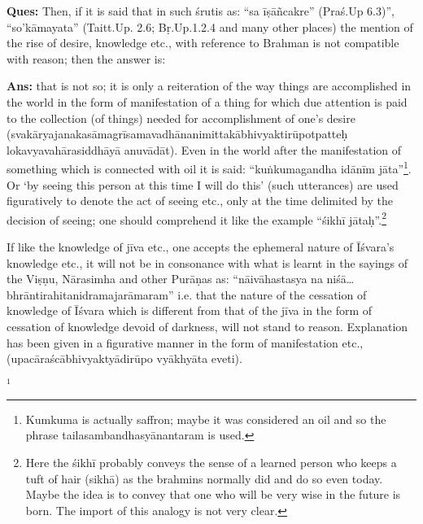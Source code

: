 \textbf{Ques:} Then, if it is said that in such śrutis as: “sa īṣāñcakre” (Praś.Up 6.3)”,  “so’kāmayata” (Taitt.Up. 2.6; Bṛ.Up.1.2.4 and many other places) the mention of the rise of desire, knowledge etc., with reference to Brahman is not compatible with reason; then the answer is: 

\textbf{Ans:} that is not so; it is only a reiteration of the way things are accomplished in the world in the form of manifestation of a thing for which due attention is paid to the collection (of things) needed for accomplishment of one’s desire (svakāryajanakasāmagrīsamavadhānanimittakābhivyaktirūpotpatteḥ lokavyavahārasiddhāyā anuvādāt). Even in the world after the manifestation of something which is connected with oil it is said:  “kuṅkumagandha idānīm jāta”\footnote{Kumkuma is actually saffron; maybe it was considered an oil and so the phrase tailasambandhasyānantaram is used.}. Or ‘by seeing this person at this time I will do this’ (such utterances) are used figuratively to denote the act of seeing etc., only at the time delimited by the decision of seeing; one should comprehend it like the example “śikhī jātaḥ”.\footnote{Here the śikhī probably conveys the sense of a learned person who keeps a tuft of hair (sikhā) as the brahmins normally did and do so even today. Maybe the idea is to convey that one who will be very wise in the future is born. The import of this analogy is not very clear.} 

If like the knowledge of jīva etc., one accepts the ephemeral nature of Īśvara’s knowledge etc., it will not be in consonance with what is learnt in the sayings of the Viṣṇu, Nārasimha and other Purāṇas as: “nāivāhastasya na niśā…bhrāntirahitanidramajarāmaram” i.e. that the nature of the cessation of knowledge of Īśvara which is different from that of the jīva in the form of cessation of knowledge devoid of darkness, will not stand to reason. Explanation has been given in a figurative manner in the form of manifestation etc., (upacāraścābhivyaktyādirūpo vyākhyāta eveti).

$^{1}$


